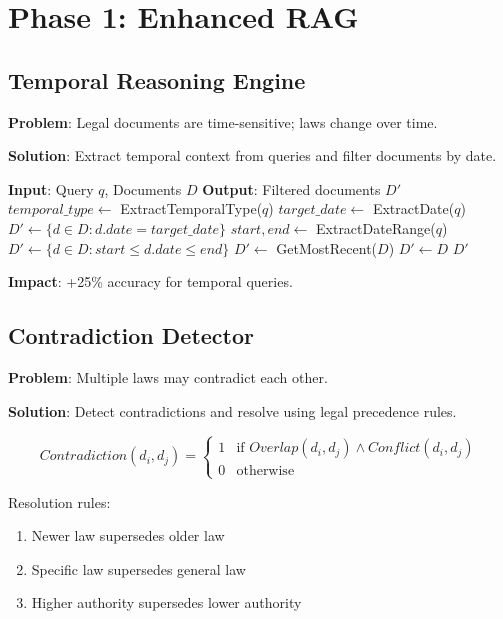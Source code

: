 \documentclass[12pt,a4paper]{article}
\begin{document}
\section{Phase 1: Enhanced RAG}

\subsection{Temporal Reasoning Engine}


\textbf{Problem}: Legal documents are time-sensitive; laws change over time.

\textbf{Solution}: Extract temporal context from queries and filter documents by date.

\begin{algorithm}
\caption{Temporal Reasoning}
\begin{algorithmic}
\STATE \textbf{Input}: Query $q$, Documents $D$
\STATE \textbf{Output}: Filtered documents $D'$
\STATE
\STATE $temporal\_type \gets$ ExtractTemporalType($q$)
    \STATE $target\_date \gets$ ExtractDate($q$)
    \STATE $D' \gets \{d \in D : d.date = target\_date\}$
    \STATE $start, end \gets$ ExtractDateRange($q$)
    \STATE $D' \gets \{d \in D : start \leq d.date \leq end\}$
    \STATE $D' \gets$ GetMostRecent($D$)
\ELSE
    \STATE $D' \gets D$
\ENDIF
\RETURN $D'$
\end{algorithmic}
\end{algorithm}

\textbf{Impact}: +25\% accuracy for temporal queries.

\subsection{Contradiction Detector}

\textbf{Problem}: Multiple laws may contradict each other.

\textbf{Solution}: Detect contradictions and resolve using legal precedence rules.

\begin{equation}
Contradiction(d_i, d_j) = \begin{cases}
    1 & \text{if } Overlap(d_i, d_j) \land Conflict(d_i, d_j) \\
    0 & \text{otherwise}
\end{cases}
\end{equation}

Resolution rules:
\begin{enumerate}
    \item Newer law supersedes older law
    \item Specific law supersedes general law
    \item Higher authority supersedes lower authority
\end{enumerate}
\end{document}
